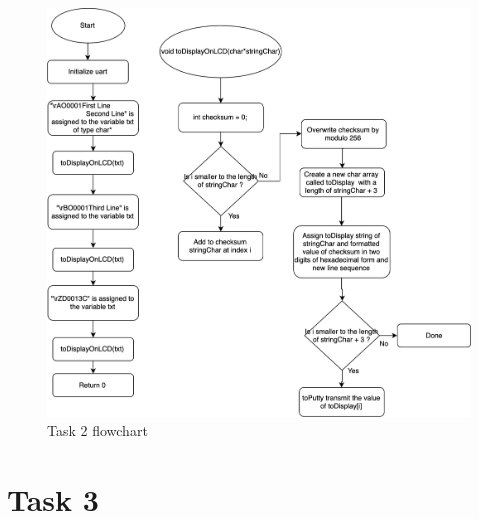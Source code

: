\documentclass[a4paper,12pt]{article}
\begin{document}
\break
\begin{figure}
\begin{center}
\includegraphics[width=\textwidth/1]{flowchart/task2_flowchart.png}
\end{center}
\caption{Task 2 flowchart}
\label{task2}
\end{figure}

\break


\section{Task 3}

\lstset{style=CStyle}
\end{document}

